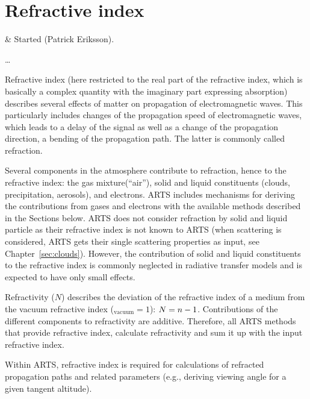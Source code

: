 \chapter{Refractive index}
 \label{sec:rindex}

 & Started (Patrick Eriksson).\\
\stophistory

 \dots

Refractive index (here restricted to the real part of
the refractive index, which is basically a complex quantity with the imaginary
part expressing absorption) describes several effects of matter on propagation
of electromagnetic waves. This particularly includes changes of the propagation
speed of electromagnetic waves, which leads to a delay of the signal as well as
a change of the propagation direction, a bending of the propagation path. The
latter is commonly called refraction.

Several components in the atmosphere contribute to refraction, hence to the
refractive index: the gas mixture(``air''), solid and liquid constituents
(clouds, precipitation, aerosols), and electrons. ARTS includes mechanisms for
deriving the contributions from gases and electrons with the available methods
described in the Sections below. ARTS does not consider
refraction by solid and liquid particle as their refractive index is not known
to ARTS (when scattering is considered, ARTS gets their single scattering
properties as input, see Chapter~\ref{sec:clouds}). However, the contribution of
solid and liquid constituents to the refractive index is commonly neglected in
radiative transfer models and is expected to have only small effects.

Refractivity ($N$) describes the deviation of the refractive index of a medium
\Rfr from the vacuum refractive index (\Rfr$_\mathrm{vacuum}=1$): $N=n-1$.
Contributions of the different components to refractivity are additive.
Therefore, all ARTS methods that provide refractive index, calculate
refractivity and sum it up with the input refractive index.

Within ARTS, refractive index is required for calculations of refracted
propagation paths and related parameters (e.g., deriving viewing angle for a
given tangent altitude). 



